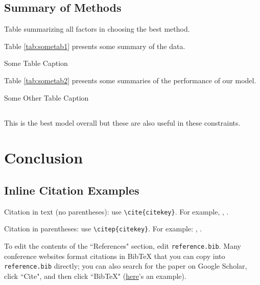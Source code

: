 \documentclass[12pt,letterpaper]{article}
\begin{document}
\subsection{Summary of Methods}
Table summarizing all factors in choosing the best method.

Table \ref{tab:sometab1} presents some summary of the data.

\begin{table}[htbp]
\caption{Some Table Caption}
\label{tab:sometab1}
\resizebox{0.4\linewidth}{!}{}
\end{table}

Table \ref{tab:sometab2} presents some summaries of the performance of our model.

\begin{table}[htbp]
\caption{Some Other Table Caption}
\label{tab:sometab2}
\resizebox{0.9\linewidth}{!}{}
\end{table}

\subsection{}
This is the best model overall
but these are also useful in these constraints.

\section{Conclusion}

\subsection{Inline Citation Examples}

Citation in text (no parentheses): use \texttt{{\textbackslash}cite\{citekey\}}. 
For example, \cite{breiman2011}, \cite{devlin2019bert}.

Citation in parentheses: use \texttt{{\textbackslash}citep\{citekey\}}. 
For example: \citep{vaswani2023attention}, \citep{karras2019stylebased}.



\makereference

{\color{blue} To edit the contents of the ``References" section, edit \texttt{reference.bib}. Many conference websites format citations in BibTeX that you can copy into \texttt{reference.bib} directly; you can also search for the paper on Google Scholar, click ``Cite", and then click ``BibTeX" (\href{https://scholar.google.com/scholar?hl=en&as_sdt=0%2C23&q=attention+is+all+you+need&btnG=#d=gs_cit&t=1700436667623&u=%2Fscholar%3Fq%3Dinfo%3A5Gohgn6QFikJ%3Ascholar.google.com%2F%26output%3Dcite%26scirp%3D0%26hl%3Den}{here}'s an example).}
\end{document}
